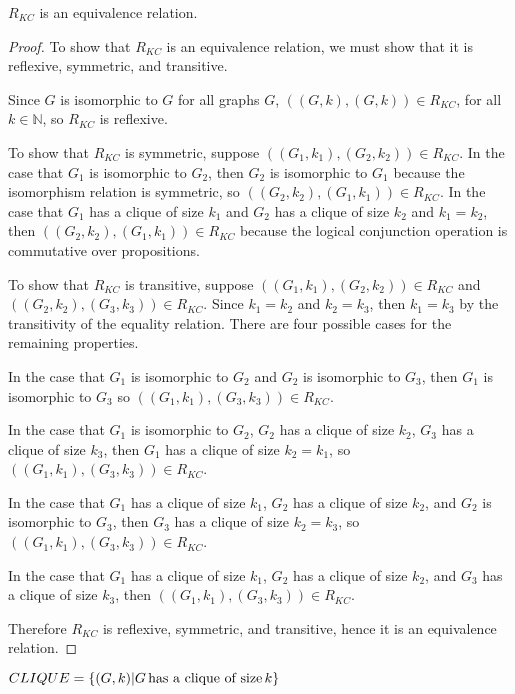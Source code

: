 \begin{theorem}$R_{KC}$ is an equivalence relation.\end{theorem}
\begin{proof}To show that $R_{KC}$ is an equivalence relation, we must show
  that it is reflexive, symmetric, and transitive.

  Since $G$ is isomorphic to $G$ for all graphs $G$, $((G,k),(G,k))\in R_{KC}$,
  for all $k\in\mathbb{N}$, so $R_{KC}$ is reflexive.

  To show that $R_{KC}$ is symmetric, suppose $((G_1, k_1), (G_2, k_2))\in
  R_{KC}$. In the case that $G_1$ is isomorphic to $G_2$, then $G_2$ is
  isomorphic to $G_1$ because the isomorphism relation is symmetric, so
  $((G_2,k_2),(G_1,k_1))\in R_{KC}$. In the case that $G_1$ has a clique of
  size $k_1$ and $G_2$ has a clique of size $k_2$ and $k_1=k_2$, then
  $((G_2,k_2),(G_1,k_1))\in R_{KC}$ because the logical conjunction operation
  is commutative over propositions.

  To show that $R_{KC}$ is transitive, suppose $((G_1, k_1), (G_2, k_2))\in
  R_{KC}$ and $((G_2, k_2), (G_3, k_3))\in R_{KC}$. Since $k_1=k_2$ and
  $k_2=k_3$, then $k_1=k_3$ by the transitivity of the equality relation. There
  are four possible cases for the remaining properties.

  In the case that $G_1$ is isomorphic to $G_2$ and $G_2$ is isomorphic to
  $G_3$, then $G_1$ is isomorphic to $G_3$ so $((G_1, k_1), (G_3, k_3))\in
  R_{KC}$.

  In the case that $G_1$ is isomorphic to $G_2$, $G_2$ has a clique of size
  $k_2$, $G_3$ has a clique of size $k_3$, then $G_1$ has a clique of size
  $k_2=k_1$, so $((G_1, k_1), (G_3, k_3))\in R_{KC}$.

  In the case that $G_1$ has a clique of size $k_1$, $G_2$ has a clique of size
  $k_2$, and $G_2$ is isomorphic to $G_3$, then $G_3$ has a clique
  of size $k_2=k_3$, so $((G_1, k_1), (G_3, k_3))\in R_{KC}$.

  In the case that $G_1$ has a clique of size $k_1$, $G_2$ has a clique of size
  $k_2$, and $G_3$ has a clique of size $k_3$, then $((G_1, k_1), (G_3,
  k_3))\in R_{KC}$.

  Therefore $R_{KC}$ is reflexive, symmetric, and transitive, hence it is an
  equivalence relation.
\end{proof}

\begin{definition}$CLIQUE=\{(G,k)|G \,\text{has a clique of size}\,
  k\}$\end{definition}

